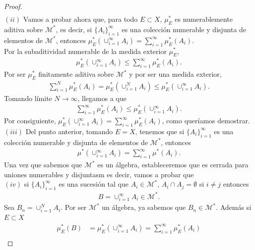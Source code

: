 \begin{proof}
\begin{align*}
\end{align*}
$(ii)$ Vamos a probar ahora que, para todo $E \subset X$, $\mu_E^*$ es numerablemente aditiva sobre $\mathcal{M}^*$, es decir,  si $\{A_i\}_{i=1}^{\infty}$ es una colección numerable y disjunta de elementos de $\mathcal{M}^*$, entonces $\mu_E^*(\cup_{i=1}^{\infty}{A_i}) = \sum_{i=1}^{\infty}{\mu_E^*(A_i)}$.
\\
\newline
Por la subaditividad numerable de la medida exterior $ \mu_E^*$,
\begin{align*}
    \mu_E^*(\cup_{i=1}^{\infty}{A_i}) \leq \sum_{i=1}^{\infty}{\mu_E^*(A_i)}.
\end{align*}
Por ser $ \mu_E^*$ finitamente aditiva sobre $\mathcal{M}^*$ y por ser una medida exterior, 
\begin{align*}
    \sum_{i=1}^{N}{\mu_E^*(A_i)} = \mu_E^*(\cup_{i=1}^{N}{A_i}) \leq \mu_E^*(\cup_{i=1}^{\infty}{A_i}).
\end{align*}
Tomando límite $N \to \infty$, llegamos a que
\begin{align*}
    \sum_{i=1}^{\infty}{\mu_E^*(A_i)}  \leq \mu_E^*(\cup_{i=1}^{\infty}{A_i}).
\end{align*}
Por consiguiente, $\mu_E^*(\cup_{i=1}^{\infty}{A_i}) = \sum_{i=1}^{\infty}{\mu_E^*(A_i)}$, como queríamos demostrar.
\\
\newline
$(iii)$ Del punto anterior, tomando $E = X$, tenemos que si $\{A_i\}_{i=1}^{\infty}$ es una colección numerable y disjunta de elementos de $\mathcal{M}^*$, entonces
\begin{align*}
      \mu^*(\cup_{i=1}^{\infty}{A_i}) = \sum_{i=1}^{\infty}{\mu^*(A_i)}.
\end{align*}
Una vez que sabemos que $\mathcal{M}^*$ es un álgebra, estableceremos que es cerrada para uniones numerables y disjuntasm es decir, vamos a probar que
\\
\newline
$(iv)$ si $\{A_i\}_{i=1}^{\infty}$ es una sucesión tal que $A_i \in \mathcal{M}^*$, $A_i \cap A_j = \emptyset$ si $i \not = j$ entonces
\begin{align*}
    B = \cup_{i=1}^{\infty}{A_i} \in \mathcal{M}^*.
\end{align*}
Sea $B_n = \cup_{i=1}^{N}{A_i}$. Por ser $\mathcal{M}^*$ un álgebra, ya sabemos que $B_n \in \mathcal{M}^*$. Además si $E \subset X$
\begin{align*}
    \mu_E^*(B) &= \mu_E^*(\cup_{i=1}^{\infty}{A_i}) = \sum_{i=1}^{\infty}{\mu_E^*(A_i)}\\

\end{align*}
\end{proof}
